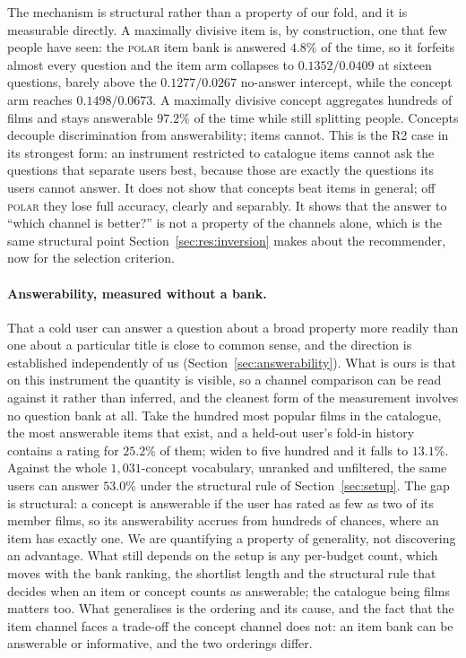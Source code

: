 \documentclass[manuscript,screen]{acmart}
\begin{document}
The mechanism is structural rather than a property of our fold, and it is measurable directly. A maximally divisive item is, by construction, one that few people have seen: the \textsc{polar} item bank is answered $4.8\%$ of the time, so it forfeits almost every question and the item arm collapses to $0.1352/0.0409$ at sixteen questions, barely above the $0.1277/0.0267$ no-answer intercept, while the concept arm reaches $0.1498/0.0673$. A maximally divisive concept aggregates hundreds of films and stays answerable $97.2\%$ of the time while still splitting people. Concepts decouple discrimination from answerability; items cannot. This is the R2 case in its strongest form: an instrument restricted to catalogue items cannot ask the questions that separate users best, because those are exactly the questions its users cannot answer. It does not show that concepts beat items in general; off \textsc{polar} they lose full accuracy, clearly and separably. It shows that the answer to ``which channel is better?'' is not a property of the channels alone, which is the same structural point Section~\ref{sec:res:inversion} makes about the recommender, now for the selection criterion.

\paragraph{Answerability, measured without a bank.} That a cold user can answer a question about a broad property more readily than one about a particular title is close to common sense, and the direction is established independently of us (Section~\ref{sec:answerability}). What is ours is that on this instrument the quantity is visible, so a channel comparison can be read against it rather than inferred, and the cleanest form of the measurement involves no question bank at all. Take the hundred most popular films in the catalogue, the most answerable items that exist, and a held-out user's fold-in history contains a rating for $25.2\%$ of them; widen to five hundred and it falls to $13.1\%$. Against the whole $1{,}031$-concept vocabulary, unranked and unfiltered, the same users can answer $53.0\%$ under the structural rule of Section~\ref{sec:setup}. The gap is structural: a concept is answerable if the user has rated as few as two of its member films, so its answerability accrues from hundreds of chances, where an item has exactly one. We are quantifying a property of generality, not discovering an advantage. What still depends on the setup is any per-budget count, which moves with the bank ranking, the shortlist length and the structural rule that decides when an item or concept counts as answerable; the catalogue being films matters too. What generalises is the ordering and its cause, and the fact that the item channel faces a trade-off the concept channel does not: an item bank can be answerable or informative, and the two orderings differ.
\end{document}
